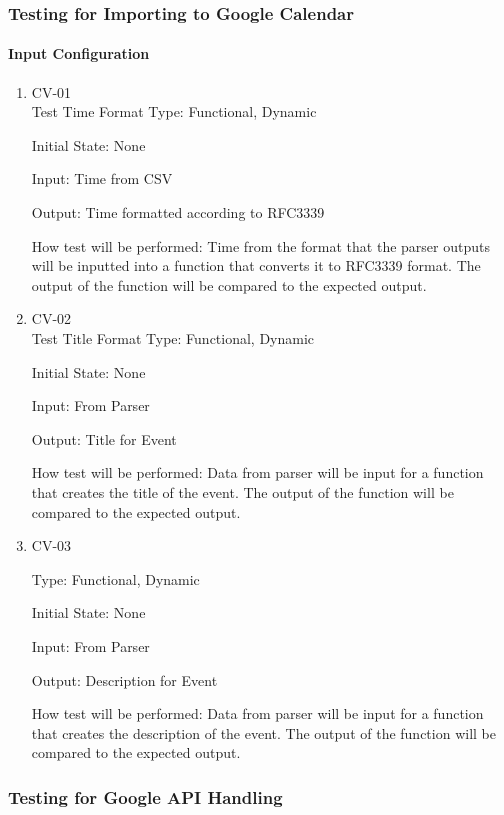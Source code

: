 \documentclass[12pt, titlepage]{article}
\begin{document}
\subsubsection{Testing for Importing to Google Calendar}

\paragraph{Input Configuration}

\begin{enumerate}

\item{CV-01\\}
Test Time Format
Type: Functional, Dynamic
					
Initial State: None
					
Input: Time from CSV
					
Output: Time formatted according to RFC3339
					
How test will be performed: 
Time from the format that the parser outputs will be inputted into a function that converts it to RFC3339 format. The output of the function will be compared to the expected output. 

\item{CV-02\\}
Test Title Format
Type: Functional, Dynamic
					
Initial State: None
					
Input: From Parser
					
Output: Title for Event
					
How test will be performed: 
Data from parser will be input for a function that creates the title of the event. 
The output of the function will be compared to the expected output.

\item{CV-03\\}

Type: Functional, Dynamic
					
Initial State: None
					
Input: From Parser
					
Output: Description for Event
					
How test will be performed: 
Data from parser will be input for a function that creates the description of the event. 
The output of the function will be compared to the expected output.
\end{enumerate}


\subsubsection{Testing for Google API Handling}
\end{document}
